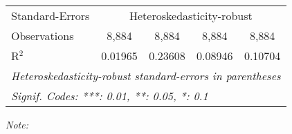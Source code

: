 \begin{table}[htbp!]
\begin{adjustbox}{width = 1\textwidth, max height = 0.95\textheight, center}
\begin{threeparttable}[b]
\begin{tabular}{lcccc}
            \midrule 
            Standard-Errors & \multicolumn{4}{c}{Heteroskedasticity-robust} \\ 
            Observations         & 8,884                           & 8,884                          & 8,884                         & 8,884\\  
            R$^2$                & 0.01965                         & 0.23608                        & 0.08946                       & 0.10704\\  
            \midrule \midrule
            \multicolumn{5}{l}{\emph{Heteroskedasticity-robust standard-errors in parentheses}}\\
            \multicolumn{5}{l}{\emph{Signif. Codes: ***: 0.01, **: 0.05, *: 0.1}}\\
         \end{tabular}
         
         \begin{tablenotes}\item \medskip \textit{Note:}
         \end{tablenotes}
      \end{threeparttable}
   \end{adjustbox}
\end{table}


